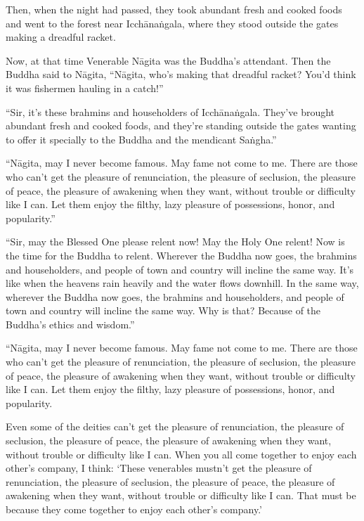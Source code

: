 \documentclass[12pt,openany]{book}%
\begin{document}
Then, when the night had passed, they took abundant fresh and cooked foods and went to the forest near \textsanskrit{Icchānaṅgala}, where they stood outside the gates making a dreadful racket. 

Now, at that time Venerable \textsanskrit{Nāgita} was the Buddha’s attendant. Then the Buddha said to \textsanskrit{Nāgita}, “\textsanskrit{Nāgita}, who’s making that dreadful racket? You’d think it was fishermen hauling in a catch!” 

“Sir, it’s these brahmins and householders of \textsanskrit{Icchānaṅgala}. They’ve brought abundant fresh and cooked foods, and they’re standing outside the gates wanting to offer it specially to the Buddha and the mendicant \textsanskrit{Saṅgha}.” 

“\textsanskrit{Nāgita}, may I never become famous. May fame not come to me. There are those who can’t get the pleasure of renunciation, the pleasure of seclusion, the pleasure of peace, the pleasure of awakening when they want, without trouble or difficulty like I can. Let them enjoy the filthy, lazy pleasure of possessions, honor, and popularity.” 

“Sir, may the Blessed One please relent now! May the Holy One relent! Now is the time for the Buddha to relent. Wherever the Buddha now goes, the brahmins and householders, and people of town and country will incline the same way. It’s like when the heavens rain heavily and the water flows downhill. In the same way, wherever the Buddha now goes, the brahmins and householders, and people of town and country will incline the same way. Why is that? Because of the Buddha’s ethics and wisdom.” 

“\textsanskrit{Nāgita}, may I never become famous. May fame not come to me. There are those who can’t get the pleasure of renunciation, the pleasure of seclusion, the pleasure of peace, the pleasure of awakening when they want, without trouble or difficulty like I can. Let them enjoy the filthy, lazy pleasure of possessions, honor, and popularity. 

Even some of the deities can’t get the pleasure of renunciation, the pleasure of seclusion, the pleasure of peace, the pleasure of awakening when they want, without trouble or difficulty like I can. When you all come together to enjoy each other’s company, I think: ‘These venerables mustn’t get the pleasure of renunciation, the pleasure of seclusion, the pleasure of peace, the pleasure of awakening when they want, without trouble or difficulty like I can. That must be because they come together to enjoy each other’s company.’ 
\end{document}
